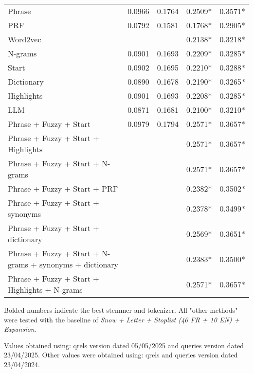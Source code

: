\begin{table}[htbp]
\begin{tabular}{|l|c|c|c|c|}
Phrase                                              & 0.0966 & 0.1764 & 0.2509*& 0.3571*\\
PRF                                                 & 0.0792 & 0.1581 & 0.1768*& 0.2905*\\
Word2vec                                            &        &        & 0.2138*& 0.3218*\\
N-grams                                             & 0.0901 & 0.1693 & 0.2209*& 0.3285*\\
Start                                               & 0.0902 & 0.1695 & 0.2210*& 0.3288*\\
Dictionary                                          & 0.0890 & 0.1678 & 0.2190*& 0.3265*\\
Highlights                                          & 0.0901 & 0.1693 & 0.2208*& 0.3285*\\
LLM                                                 & 0.0871 & 0.1681 & 0.2100*& 0.3210*\\
Phrase + Fuzzy + Start                              & 0.0979 & 0.1794 & 0.2571*& 0.3657*\\
Phrase + Fuzzy + Start + Highlights                 &        &        & 0.2571*& 0.3657*\\
Phrase + Fuzzy + Start + N-grams       &        &        & 0.2571*& 0.3657*\\
Phrase + Fuzzy + Start + PRF &        &        & 0.2382*& 0.3502*\\
Phrase + Fuzzy + Start + synonyms &        &        & 0.2378*& 0.3499*\\
Phrase + Fuzzy + Start + dictionary       &        &        & 0.2569*& 0.3651*\\
Phrase + Fuzzy + Start + N-grams + synonyms  + dictionary &        &        & 0.2383*& 0.3500*\\
Phrase + Fuzzy + Start + Highlights + N-grams       &        &        & 0.2571*& 0.3657*\\

\hline
\end{tabular}
\begin{tablenotes}
\footnotesize
\item Bolded numbers indicate the best stemmer and tokenizer. All "other methods" were tested with the baseline of \emph{Snow + Letter + Stoplist (40 FR + 10 EN) + Expansion}.
\item * Values obtained using: qrels version dated 05/05/2025 and queries version dated 23/04/2025. Other values were obtained using: qrels and queries version dated 23/04/2024.
\end{tablenotes}
\end{table}

